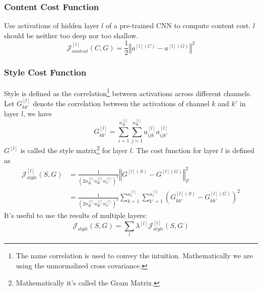 \subsubsection{Content Cost Function}
Use activations of hidden layer $l$ of a pre-trained CNN to compute content cost. $l$ should be neither too deep nor too shallow.
  \[\mathcal{J}_{content}^{[l]}(C,G)=\frac{1}{2}\left\Vert a^{[l](C)}-a^{[l](G)}\right\Vert^2\]
\subsubsection{Style Cost Function}
Style is defined as the correlation\footnote{The name correlation is used to convey the intuition. Mathematically we are using the unnormalized cross covariance.} between activations across different channels. Let $G^{[l]}_{kk'}$ denote the correlation between the activations of channel $k$ and $k'$ in layer $l$, we have
\[G^{[l]}_{kk'}=\displaystyle\sum_{i=1}^{n_H^{[l]}}\displaystyle\sum_{j=1}^{n_W^{[l]}}a^{[l]}_{ijk}a^{[l]}_{ijk'}\]
$G^{[l]}$ is called the style matrix\footnote{Mathematically it's called the Gram Matrix.} for layer $l$. The cost function for layer $l$ is defined as 
\begin{align*}
  \mathcal{J}_{style}^{[l]}(S,G)&=\frac{1}{\left(2n_H^{[l]}n_W^{[l]}n_C^{[l]}\right)^2}\left\Vert G^{[l](S)}-G^{[l](G)}\right\Vert^2_F\\
  &=\frac{1}{\left(2n_H^{[l]}n_W^{[l]}n_C^{[l]}\right)^2}\displaystyle\sum_{k=1}^{n_c^{[l]}}\displaystyle\sum_{k'=1}^{n_c^{[l]}}\left(G^{[l](S)}_{kk'}-G^{[l](G)}_{kk'}\right)^2
\end{align*}
It's useful to use the results of multiple layers:
\[\mathcal{J}_{style}(S,G)=\displaystyle\sum_{l}\lambda^{[l]}\mathcal{J}_{style}^{[l]}(S,G)\]
\ifx\PREAMBLE\undefined

\fi